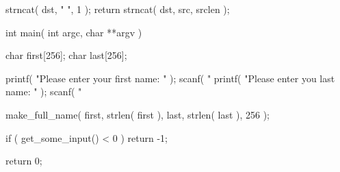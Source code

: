 \documentclass[svv,addpoints]{miunexam}
\begin{document}
\begin{questions}
\begin{src}[float,caption={Some vulnerable C code.},label={lst:overrun}]
{  strncat( dst, " ", 1 );
  return strncat( dst, src, srclen );
}

int
main( int argc, char **argv )
{
  char first[256];
  char last[256];

  printf( "Please enter your first name: " );
  scanf( "%
  printf( "Please enter you last name: " );
  scanf( "%

  make_full_name( first, strlen( first ),
                  last, strlen( last ), 256 );

  if ( get_some_input() < 0 )
    return -1;

  return 0;
}
  \end{src}

\end{questions}


\printbibliography
\end{document}

